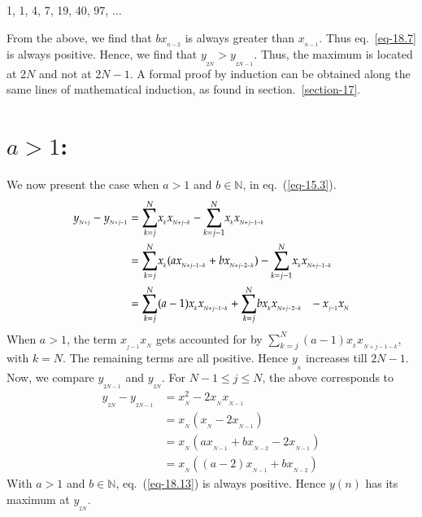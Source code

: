 \begin{multicols}{2}
\vspace{-.7cm}

\begin{center}
1, 1, 4, 7, 19, 40, 97, $\ldots$
\end{center}

\vspace{-.7cm}

From the above, we find that $b x_{_{n-2}}$ is always greater than $x_{_{n-1}}$. Thus eq.~\ref{eq-18.7} is always positive. Hence, we find that $y_{_{2N}} > y_{_{2N-1}}$. Thus, the maximum is located at 2$N$ and not at 2$N-1$. A formal proof by induction can be obtained along the same lines of mathematical induction, as found in section.~\ref{section-17}.

\vspace{-.5cm}

\section*{\underline{{$a>1$}}:}
We now present the case when $a > 1$ and $b \in \mathbb N$, in eq.~(\ref{eq-15.3}).
{\fontsize{8}{9}\selectfont\begin{align}
y_{_{N+j}} - y_{_{N+j-1}} &= \displaystyle{\sum_{k=j}^{N}}x_{_{k}}x_{_{N+j-k}} -  \displaystyle{\sum_{k=j-1}^{N}}x_{_k}x_{_{N+j-1-k}}\nonumber\\
&=\displaystyle{\sum_{k=j}^{N}}x_{_{k}}(a x_{_{N+j-1-k}}+b x_{_{N+j-2-k}}) -  \displaystyle{\sum_{k=j-1}^{N}}x_{_k}x_{_{N+j-1-k}}\label{eq-18.8}\\
&= \displaystyle{\sum_{k=j}^{N}}(a-1)x_{_{k}}x_{_{N+j-1-k}} + \displaystyle{\sum_{k=j}^{N}}bx_{_{k}}x_{_{N+j-2-k}} \hspace{0.1in}- x_{_{j-1}}x_{_N}\label{eq-18.9}
\end{align}}
When $a >1$, the term $x_{_{j-1}}x_{_N}$ gets accounted for by $\displaystyle{\sum_{k=j}^{N}}(a-1)x_{_{k}}x_{_{N+j-1-k}}$, with $k=N$. The remaining terms are all positive. Hence $y_{_n}$ increases till $2N-1$. Now, we compare $y_{_{2N-1}}$ and $y_{_{2N}}$.
For\hspace{0.1in} $N-1 \leq j \leq N$,\hspace{0.1in} the above corresponds to
\begin{align}
y_{_{2N}} - y_{_{2N-1}} &= x_{_N}^2 - 2x_{_N}x_{_{N-1}}\label{eq-18.10}\\
&= x_{_N}(x_{_N} - 2x_{_{N-1}})\label{eq-18.11}\\[.5cm]
&= x_{_N}(a x_{_{N-1}}+ b x_{_{N-2}}- 2x_{_{N-1}})\label{eq-18.12}\\
&= x_{_N}((a-2) x_{_{N-1}}+ b x_{_{N-2}})\label{eq-18.13}
\end{align} 
With $a > 1$ and $b \in \mathbb N$, eq.~(\ref{eq-18.13}) is always positive. Hence $y(n)$ has its maximum at $y_{_{2N}}$.


\end{multicols}
